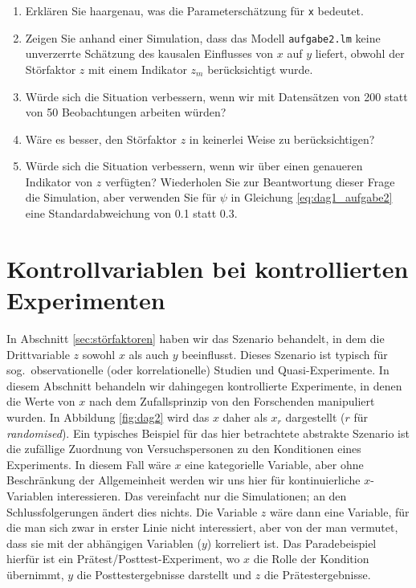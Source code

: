\documentclass[oneside, 10pt]{book}\usepackage[]{graphicx}\usepackage[]{xcolor}
\begin{document}
\begin{enumerate}
  \item Erklären Sie haargenau, was die Parameterschätzung für \texttt{x} bedeutet.
  \item Zeigen Sie anhand einer Simulation, dass das Modell \texttt{aufgabe2.lm} keine
  unverzerrte Schätzung des kausalen Einflusses von $x$ auf $y$ liefert, obwohl der Störfaktor $z$
  mit einem Indikator $z_m$ berücksichtigt wurde.
  \item Würde sich die Situation verbessern, wenn wir mit Datensätzen von 200 statt von 50 Beobachtungen
  arbeiten würden?
  \item Wäre es besser, den Störfaktor $z$ in keinerlei Weise
  zu berücksichtigen?
  \item Würde sich die Situation verbessern, wenn wir über einen
  genaueren Indikator von $z$ verfügten? Wiederholen Sie
  zur Beantwortung dieser Frage die Simulation, aber
  verwenden Sie für $\psi$ in Gleichung \ref{eq:dag1_aufgabe2}
  eine Standardabweichung von 0.1 statt 0.3.
\end{enumerate}
% 
\section{Kontrollvariablen bei kontrollierten Experimenten}\label{sec:kontrollvariablen}
In Abschnitt \ref{sec:störfaktoren} haben wir das Szenario behandelt, in dem
die Drittvariable $z$ sowohl $x$ als auch $y$ beeinflusst. Dieses Szenario ist
typisch für sog.\ observationelle (oder korrelationelle) Studien und Quasi-Experimente.
In diesem Abschnitt behandeln wir dahingegen kontrollierte Experimente, in denen
die Werte von $x$ nach dem Zufallsprinzip von den Forschenden manipuliert wurden.
In Abbildung \ref{fig:dag2} wird das $x$ daher als $x_r$ dargestellt ($r$ für \textit{randomised}).
Ein typisches Beispiel für das hier betrachtete abstrakte Szenario ist die zufällige Zuordnung von Versuchspersonen
zu den Konditionen eines Experiments.
In diesem Fall wäre $x$ eine kategorielle
Variable, aber ohne Beschränkung der Allgemeinheit werden wir uns hier für kontinuierliche
$x$-Variablen interessieren. Das vereinfacht nur die Simulationen; an den Schlussfolgerungen
ändert dies nichts.
Die Variable $z$ wäre dann eine Variable, für die man sich zwar in erster Linie nicht interessiert,
aber von der man vermutet, dass sie mit der abhängigen Variablen ($y$) korreliert ist.
Das Paradebeispiel hierfür ist ein Prätest/Posttest-Experiment, wo $x$ die Rolle der Kondition übernimmt,
$y$ die Posttestergebnisse darstellt und $z$ die Prätestergebnisse.
\end{document}
